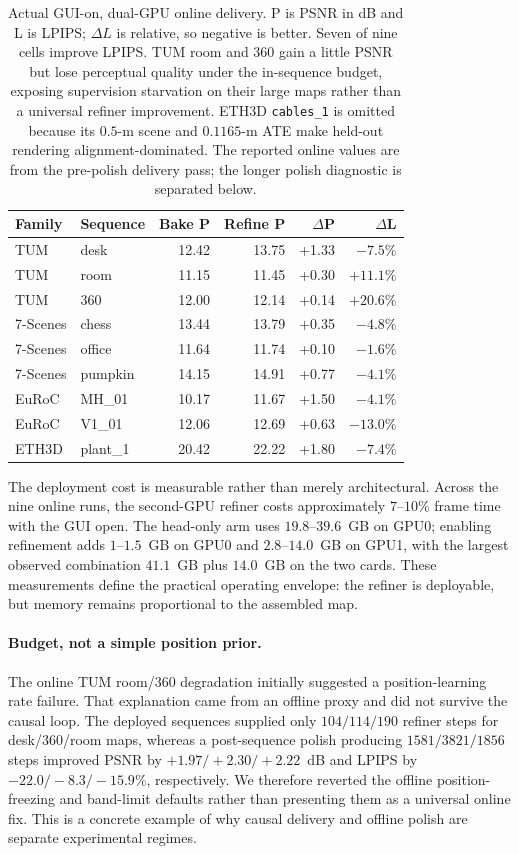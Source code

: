 \begin{table}[t]
\centering\small
\setlength{\tabcolsep}{2.7pt}
\begin{tabular}{@{}llrrrr@{}}
\toprule
Family & Sequence & Bake P & Refine P & $\Delta$P & $\Delta$L \\
\midrule
TUM & desk & 12.42 & 13.75 & +1.33 & $-7.5\%$ \\
TUM & room & 11.15 & 11.45 & +0.30 & $+11.1\%$ \\
TUM & 360 & 12.00 & 12.14 & +0.14 & $+20.6\%$ \\
7-Scenes & chess & 13.44 & 13.79 & +0.35 & $-4.8\%$ \\
7-Scenes & office & 11.64 & 11.74 & +0.10 & $-1.6\%$ \\
7-Scenes & pumpkin & 14.15 & 14.91 & +0.77 & $-4.1\%$ \\
EuRoC & MH\_01 & 10.17 & 11.67 & +1.50 & $-4.1\%$ \\
EuRoC & V1\_01 & 12.06 & 12.69 & +0.63 & $-13.0\%$ \\
ETH3D & plant\_1 & 20.42 & 22.22 & +1.80 & $-7.4\%$ \\
\bottomrule
\end{tabular}
\caption{Actual GUI-on, dual-GPU online delivery. P is PSNR in dB and L is
LPIPS; $\Delta L$ is relative, so negative is better. Seven of nine cells
improve LPIPS. TUM room and 360 gain a little PSNR but lose perceptual quality
under the in-sequence budget, exposing supervision starvation on their large
maps rather than a universal refiner improvement. ETH3D \texttt{cables\_1} is
omitted because its $0.5$-m scene and $0.1165$-m ATE make held-out rendering
alignment-dominated. The reported online values are from the pre-polish
delivery pass; the longer polish diagnostic is separated below.}
\label{tab:online}
\end{table}

The deployment cost is measurable rather than merely architectural. Across
the nine online runs, the second-GPU refiner costs approximately $7$--$10\%$
frame time with the GUI open. The head-only arm uses $19.8$--$39.6$~GB on
GPU0; enabling refinement adds $1$--$1.5$~GB on GPU0 and $2.8$--$14.0$~GB on
GPU1, with the largest observed combination $41.1$~GB plus $14.0$~GB on the
two cards. These measurements define the practical operating envelope: the
refiner is deployable, but memory remains proportional to the assembled map.

\paragraph{Budget, not a simple position prior.}
The online TUM room/360 degradation initially suggested a position-learning
rate failure. That explanation came from an offline proxy and did not survive
the causal loop. The deployed sequences supplied only $104/114/190$ refiner
steps for desk/360/room maps, whereas a post-sequence polish producing
$1581/3821/1856$ steps improved PSNR by $+1.97/+2.30/+2.22$~dB and LPIPS by
$-22.0/-8.3/-15.9\%$, respectively. We therefore reverted the offline
position-freezing and band-limit defaults rather than presenting them as a
universal online fix. This is a concrete example of why causal delivery and
offline polish are separate experimental regimes.

